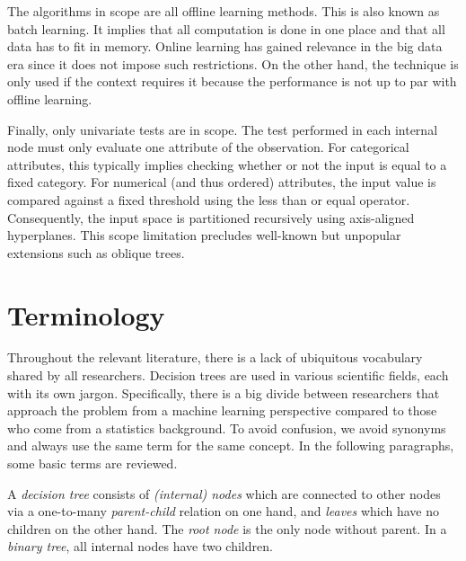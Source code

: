 The algorithms in scope are all offline learning methods. This is also known as batch learning. It implies that all computation is done in one place and that all data has to fit in memory. Online learning has gained relevance in the big data era since it does not impose such restrictions. On the other hand, the technique is only used if the context requires it because the performance is not up to par with offline learning.

Finally, only univariate tests are in scope. The test performed in each internal node must only evaluate one attribute of the observation. For categorical attributes, this typically implies checking whether or not the input is equal to a fixed category. For numerical (and thus ordered) attributes, the input value is compared against a fixed threshold using the less than or equal operator. Consequently, the input space is partitioned recursively using axis-aligned hyperplanes. This scope limitation precludes well-known but unpopular extensions such as oblique trees.


\section{Terminology}
Throughout the relevant literature, there is a lack of ubiquitous vocabulary shared by all researchers. Decision trees are used in various scientific fields, each with its own jargon. Specifically, there is a big divide between researchers that approach the problem from a machine learning perspective compared to those who come from a statistics background. To avoid confusion, we avoid synonyms and always use the same term for the same concept. In the following paragraphs, some basic terms are reviewed. 

A \emph{decision tree} consists of \emph{(internal) nodes} which are connected to other nodes via a one-to-many \emph{parent-child} relation on one hand, and \emph{leaves} which have no children on the other hand. The \emph{root node} is the only node without parent. In a \emph{binary tree}, all internal nodes have two children.

